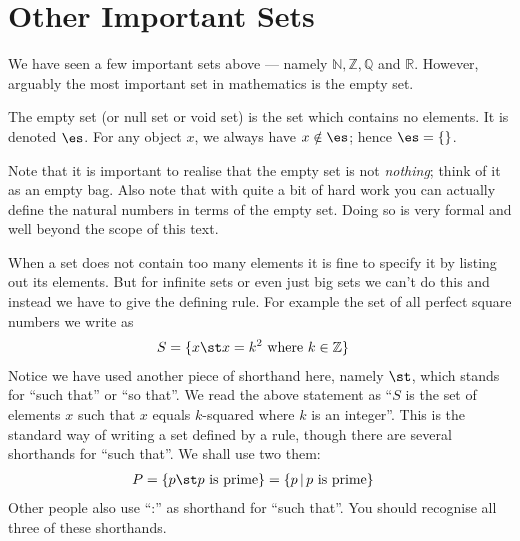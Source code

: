 \section{Other Important Sets}\label{sec_0_3}
We have seen a few important sets above --- namely $\mathbb{N}, \mathbb{Z},
\mathbb{Q}$ and $\mathbb{R}$. However, arguably the most important set in
mathematics is the empty set.
\begin{defn}\label{def_0_3_1}
  The empty set (or null set or void set) is the set which contains no
elements. It is denoted $\es$. For any object $x$, we always
have $x \notin \es$; hence $\es = \{ \}$.
\end{defn}
Note that it is important to realise that the empty set is not \emph{nothing}; think of it
as an empty bag. Also note that with quite a bit of hard work you can actually define the
natural numbers in terms of the empty set. Doing so is very formal and well beyond the
scope of this text.


When a set does not contain too many elements it is fine to specify it by listing out its
elements.  But for infinite sets or even just big sets we can't do this and instead we
have to give the defining rule. For example the set of all perfect square numbers we
write as
\begin{align*}
  S &= \{x \st x = k^2 \mbox{ where } k \in \mathbb{Z} \}
\end{align*}
Notice we have used another piece of shorthand here, namely $\st$, which
stands for ``such that'' or ``so that''. We read the above statement as ``$S$ is
the set of elements $x$ such that $x$ equals $k$-squared where $k$ is an
integer''. This is the standard way of writing a set defined by a rule, though there are
several shorthands for ``such that''. We shall use two them:
\begin{align*}
  P &= \{ p \st p \mbox{ is prime} \} = \{ p \,|\, p \mbox{ is prime} \}
\end{align*}
Other people also use ``:'' as shorthand for ``such that''. You should 
recognise all three of these shorthands.

